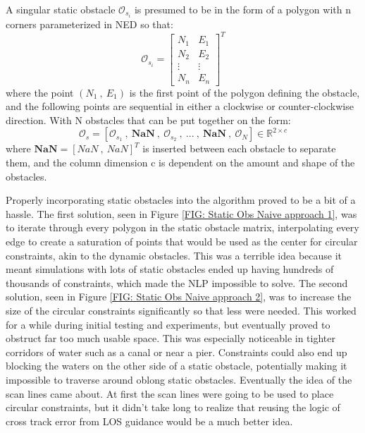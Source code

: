 A singular static obstacle $\mathcal{O}_{s_{i}}$ is presumed to be in the form of a polygon with n corners parameterized
in NED so that:
\begin{equation}
    \mathcal{O}_{s_{i}} = \begin{bmatrix}
                              N_1 & E_1 \\
                              N_2 & E_2 \\
                            \vdots & \vdots\\
                              N_n & E_n
                            \end{bmatrix}^T
\end{equation}
where the point $(N_1 \ , \ E_1)$ is the first point of the polygon defining the obstacle, and the following points are sequential in either a clockwise
or counter-clockwise direction. With N obstacles that can be put together on the form:
\begin{equation}
    \mathcal{O}_s = [\mathcal{O}_{s_{1}} \ , \ \textbf{NaN} \ , \ \mathcal{O}_{s_{2}} \ , \ ... \ , \ \textbf{NaN} \ , \ \mathcal{O}_N] \in \mathbb{R}^{2 \times c}
\end{equation}
where $\textbf{NaN} = [NaN \ , \ NaN]^T$ is inserted between each obstacle to separate them, 
and the column dimension c is dependent on the amount and shape of the obstacles.

Properly incorporating static obstacles into the algorithm proved to be a bit of a hassle. The first solution, seen in 
Figure \ref{FIG: Static Obs Naive approach 1}, was to iterate through every polygon in the static obstacle matrix, interpolating
every edge to create a saturation of points that would be used as the center for circular constraints, akin to the dynamic
obstacles. This was a terrible idea because it meant simulations with lots of static obstacles ended up having hundreds of thousands
of constraints, which made the \gls{NLP} impossible to solve. 
The second solution, seen in Figure \ref{FIG: Static Obs Naive approach 2}, was to increase the size of the circular constraints
significantly so that less were needed. This worked for a while during initial testing and experiments, 
but eventually proved to obstruct far too much usable space. This was especially
noticeable in tighter corridors of water such as a canal or near a pier. Constraints could also end up blocking the waters
on the other side of a static obstacle, potentially making it impossible to traverse around oblong static obstacles.
Eventually the idea of the scan lines came about. At first the scan lines
were going to be used to place circular constraints, but it didn't take long to realize that reusing the logic of cross track
error from LOS guidance would be a much better idea. 

